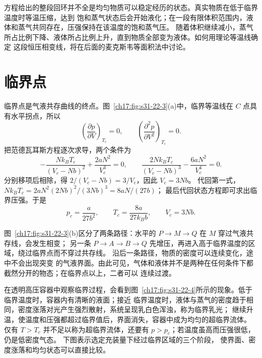 {方程给出的整段回环并不全是均匀物质可以稳定经历的状态。真实物质在低于临界温度时等温压缩，达到
饱和蒸气状态后会开始液化；在一段有限体积范围内，液体和蒸气共同存在，压强保持在该温度的饱和蒸气压。
随着体积继续减小，蒸气所占比例下降、液体所占比例上升，直到物质全部变为液体。如何用理论等温线确定
这段恒压相变线，将在后面的麦克斯韦等面积法中讨论。

\section{临界点}

临界点是气液共存曲线的终点。图~\ref{ch17:fig:s31-22-3}(a)中，临界等温线在 $C$ 点具有水平拐点，所以
\[
  \left(\frac{\partial p}{\partial V}\right)_{T_c}=0,
  \qquad
  \left(\frac{\partial^2 p}{\partial V^2}\right)_{T_c}=0.
\]
把范德瓦耳斯方程逐次求导，两个条件为
\[ -\frac{Nk_BT_c}{(V_c-Nb)^2}+\frac{2aN^2}{V_c^3}=0,
\qquad \frac{2Nk_BT_c}{(V_c-Nb)^3}-\frac{6aN^2}{V_c^4}=0.\]
分别移项后相除，得 $2/(V_c-Nb)=3/V_c$，因此 $V_c=3Nb$。
代回第一式，$Nk_BT_c=2aN^2(2Nb)^2/(3Nb)^3=8aN/(27b)$；
最后代回状态方程即可求出临界压强。于是
\begin{equation}
  \boxed{p_c=\frac{a}{27b^2},\qquad
  T_c=\frac{8a}{27k_Bb},\qquad V_c=3Nb}.
  \label{ch17:eq:s31-22-3}
\end{equation}

\par\noindent\begin{minipage}{\linewidth}
\criticalPointFigure
{}\label{ch17:fig:s31-22-3}
\end{minipage}\par\medskip

图~\ref{ch17:fig:s31-22-3}(b)区分了两条路径：水平的 $P\to M\to Q$ 在 $M$ 穿过气液共存线，会发生相变；
另一条 $P\to A\to B\to Q$ 先增压，再进入高于临界温度的区域，绕过临界点而不穿过共存线。
沿后一条路径，物质的密度可以连续变化，途中不会出现突变
的气液界面。由此可见，气体和液体并不是两种在任何条件下都截然分开的物态；在临界点以上，二者可以
连续过渡。

在透明高压容器中观察临界过程，会看到图~\ref{ch17:fig:s31-22-4}所示的现象。低于临界温度时，容器内有清晰的液面；接近
临界温度时，液体与蒸气的密度趋于相同，密度涨落对光产生强烈散射，系统呈现乳白色浑浊，称为临界乳光；
继续升温，使温度和压强都超过临界值后，界面消失，容器中成为均匀的超临界流体。
仅有 $T>T_c$ 并不足以称为超临界流体，还要有 $p>p_c$；若温度虽高而压强很低，仍是低密度气态。
下图表示选定充装量下经过临界区域的三个阶段，
使界面、密度涨落和均匀状态可以直接比较。

}
